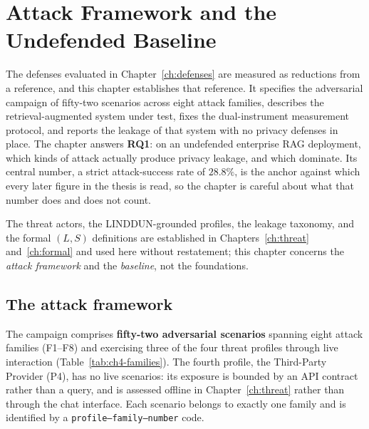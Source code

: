\documentclass[11pt,a4paper]{report}
\begin{document}
\fi

\chapter{Attack Framework and the Undefended Baseline}
\label{ch:baseline}

The defenses evaluated in Chapter~\ref{ch:defenses} are measured as reductions from a reference,
and this chapter establishes that reference. It specifies the adversarial campaign of fifty-two
scenarios across eight attack families, describes the retrieval-augmented system under test, fixes
the dual-instrument measurement protocol, and reports the leakage of that system with no privacy
defenses in place. The chapter answers \textbf{RQ1}: on an undefended enterprise RAG deployment,
which kinds of attack actually produce privacy leakage, and which dominate. Its central number, a
strict attack-success rate of $28.8\%$, is the anchor against which every later figure in the
thesis is read, so the chapter is careful about what that number does and does not count.

The threat actors, the LINDDUN-grounded profiles, the leakage taxonomy, and the formal $(L,S)$
definitions are established in Chapters~\ref{ch:threat} and~\ref{ch:formal} and used here without
restatement; this chapter concerns the \emph{attack framework} and the \emph{baseline}, not the
foundations.

\section{The attack framework}
\label{sec:ch4-framework}

The campaign comprises \textbf{fifty-two adversarial scenarios} spanning eight attack families
(F1--F8) and exercising three of the four threat profiles through live interaction
(Table~\ref{tab:ch4-families}). The fourth profile, the Third-Party Provider (P4), has no live
scenarios: its exposure is bounded by an API contract rather than a query, and is assessed
offline in Chapter~\ref{ch:threat} rather than through the chat interface. Each scenario
belongs to exactly one family and is identified by a \texttt{profile--family--number} code.
\end{document}
